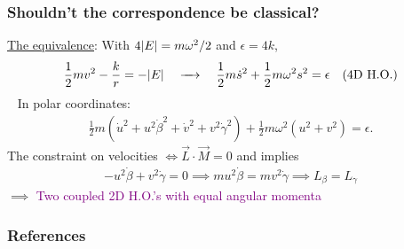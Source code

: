 \documentclass{beamer}
\theoremstyle{definition}
\newcommand{\f}[2]{\frac{#1}{#2}}
\newcommand{\be}{\beta}
\begin{document}
\begin{frame}
\frametitle{Shouldn't the correspondence be classical?}

\underline{The equivalence}: With $4\abs{E} = m\omega^2/2 $ and $\epsilon = 4k$,
\begin{align*}
\f{1}{2} mv^2  - \f{k}{r} = -\abs{E} 
\quad \xrightarrow{\quad} \quad
\f{1}{2} m \dot{s}^2 + \f{1}{2} m\omega^2 s^2 = \epsilon \quad \text{(4D H.O.)}
\end{align*}
\,\,\,
\pause 
In polar coordinates:
\begin{align*}
\f{1}{2}m (\dot{u}^2 + u^2 \dot{\beta}^2 + \dot{v}^2 + v^2 \dot{\gamma}^2 ) + \f{1}{2} m\omega^2 (u^2 + v^2) = \epsilon.
\end{align*}
\pause 
The constraint on velocities $\iff \vec{L} \cdot \vec{M} = 0$ and implies
\begin{align*}
 -u^2 \dot{\be} + v^2 \dot{\gamma} = 0 \implies  
 mu^2\dot{\be} = m v^2 \dot{\gamma} 
 \implies   L_\be = L_\gamma
\end{align*}
\pause 
$\implies$ \textcolor{purple}{Two coupled 2D H.O.'s with equal angular momenta}
\end{frame}



\begin{frame}[allowframebreaks]
	\frametitle{References}
	\fontsize{6pt}{7pt}\selectfont
	
 	
	
\end{frame}
\end{document}
